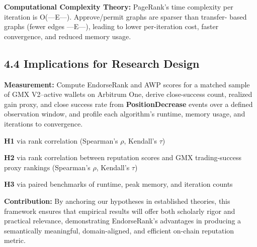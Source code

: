 \textbf{Computational Complexity Theory: }PageRank's time complexity per iteration is O(---E---). Approve/permit graphs are sparser than transfer- based graphs (fewer edges ---E---), leading to lower per-iteration cost, faster convergence, and reduced memory usage.


\subsection*{4.4 Implications for Research Design}
\label{sec:implications-for-research-design}

\textbf{Measurement: }Compute EndorseRank and AWP scores for a matched sample of GMX V2--active wallets on Arbitrum One, derive close-success count, realized gain proxy, and close success rate from \textbf{PositionDecrease} events over a defined observation window, and profile each algorithm's runtime, memory usage, and iterations to convergence.



\textbf{H1 }via rank correlation (Spearman's \emph{\(\rho\)}, Kendall's \emph{\(\tau\)})


\textbf{H2 }via rank correlation between reputation scores and GMX trading-success proxy rankings (Spearman's \emph{\(\rho\)}, Kendall's \emph{\(\tau\)})


\textbf{H3 }via paired benchmarks of runtime, peak memory, and iteration counts


\textbf{Contribution: }By anchoring our hypotheses in established theories, this framework ensures that empirical results will offer both scholarly rigor and practical relevance, demonstrating EndorseRank's advantages in producing a semantically meaningful, domain-aligned, and efficient on-chain reputation metric.
